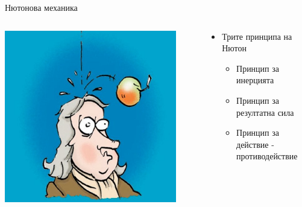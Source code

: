 \documentclass[10pt,a4paper]{beamer}
\begin{document}
        \begin{frame}{ Нютонова механика }
            \begin{columns}
                \begin{column}{0.5\textwidth}
                    \includegraphics[width=0.9\textwidth]{images/newton_apple.jpg}
                \end{column}
                \begin{column}{0.5\textwidth}
                    \begin{itemize}
                        \item Трите принципа на Нютон \begin{itemize}
                            \item Принцип за инерцията
                            \item Принцип за резултатна сила
                            \item Принцип за действие - противодействие
                        \end{itemize}
                    \end{itemize}
                \end{column}
            \end{columns}
        \end{frame}
        
\end{document}
